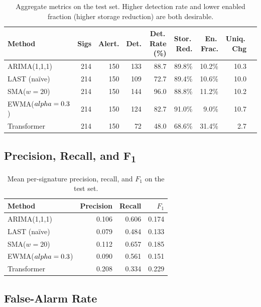 \documentclass[11pt,a4paper]{article}
\begin{document}
\begin{table}[H]
\centering
\caption{Aggregate metrics on the test set. Higher detection rate and
  lower enabled fraction (higher storage reduction) are both desirable.}
\label{tab:agg}
\begin{tabular}{lrrrrrrrr}
\toprule
Method & Sigs & Alert. & Det. & Det.\,Rate (\%) & Stor.\,Red. & En.\,Frac. & Uniq.\,Chg \\
\midrule
ARIMA(1,1,1) & 214 & 150 & 133 & 88.7 & 89.8\% & 10.2\% & 10.3 \\
LAST (na\"ive) & 214 & 150 & 109 & 72.7 & 89.4\% & 10.6\% & 10.0 \\
SMA($w=20$) & 214 & 150 & 144 & 96.0 & 88.8\% & 11.2\% & 10.2 \\
EWMA($\\alpha=0.3$) & 214 & 150 & 124 & 82.7 & 91.0\% & 9.0\% & 10.7 \\
Transformer & 214 & 150 & 72 & 48.0 & 68.6\% & 31.4\% & 2.7 \\
\bottomrule
\end{tabular}
\end{table}


\subsection{Precision, Recall, and F\textsubscript{1}}

\begin{table}[H]
\centering
\caption{Mean per-signature precision, recall, and $F_1$ on the test set.}
\label{tab:prf}
\begin{tabular}{lrrr}
\toprule
Method & Precision & Recall & $F_1$ \\
\midrule
ARIMA(1,1,1) & 0.106 & 0.606 & 0.174 \\
LAST (na\"ive) & 0.079 & 0.484 & 0.133 \\
SMA($w=20$) & 0.112 & 0.657 & 0.185 \\
EWMA($\\alpha=0.3$) & 0.090 & 0.561 & 0.151 \\
Transformer & 0.208 & 0.334 & 0.229 \\
\bottomrule
\end{tabular}
\end{table}


\subsection{False-Alarm Rate}
\end{document}
